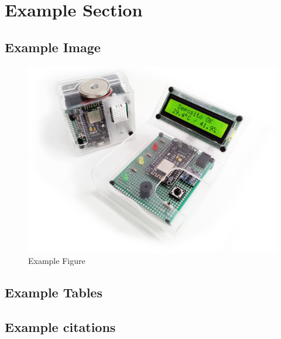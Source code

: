 
\section{Example Section}
\label{sect:example-section}

\spar
\sideboxend

\stext[2-7]

\subsection{Example Image}

\stext[7-10]

\begin{figure}
  \centering
  \includegraphics[width=1\columnwidth]{../photos/chanams-front}
  \caption{Example Figure}
  \label{fig:example}
\end{figure}

\subsection{Example Tables}



\stext[11-15]


\sspar

\subsection{Example citations}


